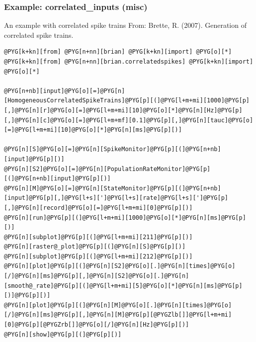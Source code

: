 \documentclass[letterpaper,10pt,english]{manual}
\begin{document}
\resetcurrentobjects
\hypertarget{--doc-examples-misc_correlated_inputs}{}

\hypertarget{index-42}{}\subsubsection{Example: correlated\_inputs (misc)}

An example with correlated spike trains
From: Brette, R. (2007). Generation of correlated spike trains.

\begin{Verbatim}[commandchars=@\[\]]
@PYG[k+kn][from] @PYG[n+nn][brian] @PYG[k+kn][import] @PYG[o][*]
@PYG[k+kn][from] @PYG[n+nn][brian.correlatedspikes] @PYG[k+kn][import] @PYG[o][*]

@PYG[n+nb][input]@PYG[o][=]@PYG[n][HomogeneousCorrelatedSpikeTrains]@PYG[p][(]@PYG[l+m+mi][1000]@PYG[p][,]@PYG[n][r]@PYG[o][=]@PYG[l+m+mi][10]@PYG[o][*]@PYG[n][Hz]@PYG[p][,]@PYG[n][c]@PYG[o][=]@PYG[l+m+mf][0.1]@PYG[p][,]@PYG[n][tauc]@PYG[o][=]@PYG[l+m+mi][10]@PYG[o][*]@PYG[n][ms]@PYG[p][)]

@PYG[n][S]@PYG[o][=]@PYG[n][SpikeMonitor]@PYG[p][(]@PYG[n+nb][input]@PYG[p][)]
@PYG[n][S2]@PYG[o][=]@PYG[n][PopulationRateMonitor]@PYG[p][(]@PYG[n+nb][input]@PYG[p][)]
@PYG[n][M]@PYG[o][=]@PYG[n][StateMonitor]@PYG[p][(]@PYG[n+nb][input]@PYG[p][,]@PYG[l+s][']@PYG[l+s][rate]@PYG[l+s][']@PYG[p][,]@PYG[n][record]@PYG[o][=]@PYG[l+m+mi][0]@PYG[p][)]
@PYG[n][run]@PYG[p][(]@PYG[l+m+mi][1000]@PYG[o][*]@PYG[n][ms]@PYG[p][)]
@PYG[n][subplot]@PYG[p][(]@PYG[l+m+mi][211]@PYG[p][)]
@PYG[n][raster@_plot]@PYG[p][(]@PYG[n][S]@PYG[p][)]
@PYG[n][subplot]@PYG[p][(]@PYG[l+m+mi][212]@PYG[p][)]
@PYG[n][plot]@PYG[p][(]@PYG[n][S2]@PYG[o][.]@PYG[n][times]@PYG[o][/]@PYG[n][ms]@PYG[p][,]@PYG[n][S2]@PYG[o][.]@PYG[n][smooth@_rate]@PYG[p][(]@PYG[l+m+mi][5]@PYG[o][*]@PYG[n][ms]@PYG[p][)]@PYG[p][)]
@PYG[n][plot]@PYG[p][(]@PYG[n][M]@PYG[o][.]@PYG[n][times]@PYG[o][/]@PYG[n][ms]@PYG[p][,]@PYG[n][M]@PYG[p][@PYGZlb[]]@PYG[l+m+mi][0]@PYG[p][@PYGZrb[]]@PYG[o][/]@PYG[n][Hz]@PYG[p][)]
@PYG[n][show]@PYG[p][(]@PYG[p][)]
\end{Verbatim}

\resetcurrentobjects
\hypertarget{--doc-examples-misc_CUBA}{}
\end{document}
